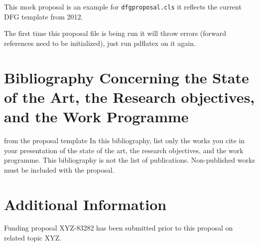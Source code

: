 \documentclass[    %
    gitinfo,       %
    RAM,           %
    general,       %
    \classoptions] %
    {dfgproposal}
\begin{document}
\begin{center}\color{red}\huge
  This mock proposal is an example for \texttt{dfgproposal.cls} it reflects the current
  DFG template from 2012.
\end{center}
\begin{Large}\color{red}
  The first time this proposal file is being run it will throw errors (forward references
  need to be initialized), just run pdflatex on it again.
\end{Large}

\begin{proposal}[
  PI=miko,
  mikoname=Michael Kohlhase,
  mikoaffiliation=FAU Erlangen N\"urnberg,
  mikodept=Computer Science,
  mikotitle=Prof. Dr.,
  PI=gc,
  gcname=Great Communicator,
  gcaffiliation=Power Consulting GmbH,
  gcdept=Science Affairs,
  gctitle=Dr.,
  site=fau,
  fauacronym=FAU,
  faushortname=FAU Erlangen N\"urnberg,
  site=pcg,
  pcgacronym=PCG,
  pcgshortname=Power Consulting GmbH,
  thema=Intelligentes Schreiben von Antr\"agen,
  acronym={iPoWr},
  acrolong={\underline{I}ntelligent} {\underline{P}r\underline{o}posal} {\underline{Wr}iting},
  title=\pn: \protect\pnlong,
  totalduration=3 years,
  start=1. Feb. 2010,
  months=24,
  discipline=Computer Science, 
  areas=Knowledge Management,
  keywords={LaTeX Active Documents}
  ]






\section{Bibliography Concerning the State of the Art, the Research objectives, and the
  Work Programme}\label{sec:bib}

\begin{todo}{from the proposal template}
In this bibliography, list only the works you cite in your presentation of the state of the
art, the research objectives, and the work programme. This bibliography is not the list
of publications. Non-published works must be included with the proposal.
\end{todo}
\printbibliography[heading=empty,notcategory=featured]
\ifpublic\else



\section{Additional Information}\label{sec:additional}

Funding proposal XYZ-83282 has been submitted prior to this proposal on related topic XYZ.
\fi %
\end{proposal}
\end{document}
